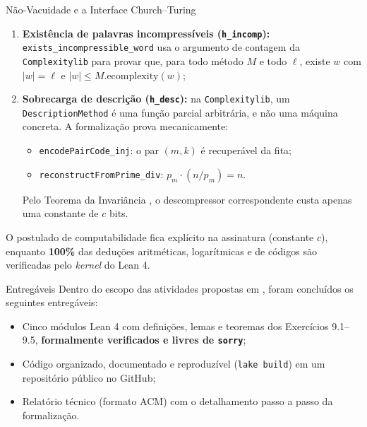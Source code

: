 \documentclass[10pt, aspectratio=43]{beamer}
\begin{document}
\begin{frame}{Não-Vacuidade e a Interface Church--Turing}
    \begin{enumerate}
        \item \textbf{Existência de palavras incompressíveis (\texttt{h\_incomp}):} \texttt{exists\_incompressible\_word} usa o argumento de contagem da \texttt{Complexitylib} para provar que, para todo método $M$ e todo $\ell$, existe $w$ com $|w| = \ell$ e $|w| \le M.\text{ecomplexity}(w)$;
        \medskip
        \item \textbf{Sobrecarga de descrição (\texttt{h\_desc}):} na \texttt{Complexitylib}, um \texttt{DescriptionMethod} é uma função parcial arbitrária, e não uma máquina concreta. A formalização prova mecanicamente:
        \begin{itemize}
            \item \texttt{encodePairCode\_inj}: o par $(m, k)$ é recuperável da fita;
            \item \texttt{reconstructFromPrime\_div}: $p_m \cdot (n/p_m) = n$.
        \end{itemize}
        Pelo Teorema da Invariância \cite{li2019introduction}, o descompressor correspondente custa apenas uma constante de $c$ bits.
    \end{enumerate}
    \begin{tcolorbox}[pucbox, title=Separação de Responsabilidades]
        \small O postulado de computabilidade fica explícito na assinatura (constante $c$), enquanto \textbf{100\%} das deduções aritméticas, logarítmicas e de códigos são verificadas pelo \textit{kernel} do Lean 4.
    \end{tcolorbox}
\end{frame}

\begin{frame}{Entregáveis}
    Dentro do escopo das atividades propostas em , foram concluídos os seguintes entregáveis:
    \medskip

    \begin{tcolorbox}[pucbox, title=Entregáveis do Projeto]
        \begin{itemize}
            \item[$\checkmark$] Cinco módulos Lean 4 com definições, lemas e teoremas dos Exercícios 9.1--9.5, \textbf{formalmente verificados e livres de \texttt{sorry}};
            \item[$\checkmark$] Código organizado, documentado e reproduzível (\texttt{lake build}) em um repositório público no GitHub;
            \item[$\checkmark$] Relatório técnico (formato ACM) com o detalhamento passo a passo da formalização.
        \end{itemize}
    \end{tcolorbox}
\end{frame}
\end{document}
